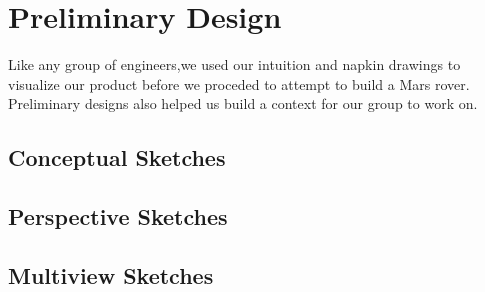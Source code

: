 \chapter{Preliminary Design}
Like any group of engineers,we used our intuition and napkin drawings to visualize our product before we proceded to attempt to build a Mars rover.
Preliminary designs also helped us build a context for our group to work on.

\section{Conceptual Sketches}
 
\clearpage

\section{Perspective Sketches}
 
\clearpage

\section{Multiview Sketches}
 
\clearpage
